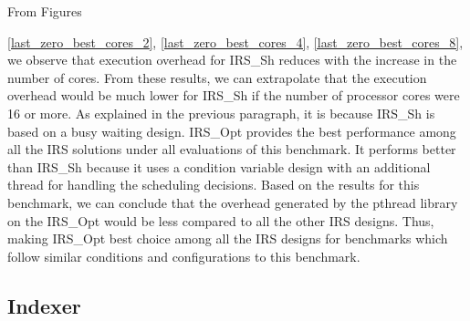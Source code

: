 From Figures~{\ref{last_zero_best_cores_2}, \ref{last_zero_best_cores_4}, \ref{last_zero_best_cores_8}, we observe that execution overhead for IRS\_Sh reduces with the increase in the number of cores. 
From these results, we can extrapolate that the execution overhead would be much lower for IRS\_Sh if the number of processor cores were 16 or more. 
As explained in the previous paragraph, it is because IRS\_Sh is based on a busy waiting design. 
IRS\_Opt provides the best performance among all the IRS solutions under all evaluations of this benchmark. 
It performs better than IRS\_Sh because it uses a condition variable design with an additional thread for handling the scheduling decisions. 
Based on the results for this benchmark, we can conclude that the overhead generated by the pthread library on the IRS\_Opt would be less compared to all the other IRS designs. 
Thus, making IRS\_Opt best choice among all the IRS designs for benchmarks which follow similar conditions and configurations to this benchmark. 




\subsection{Indexer}



}
